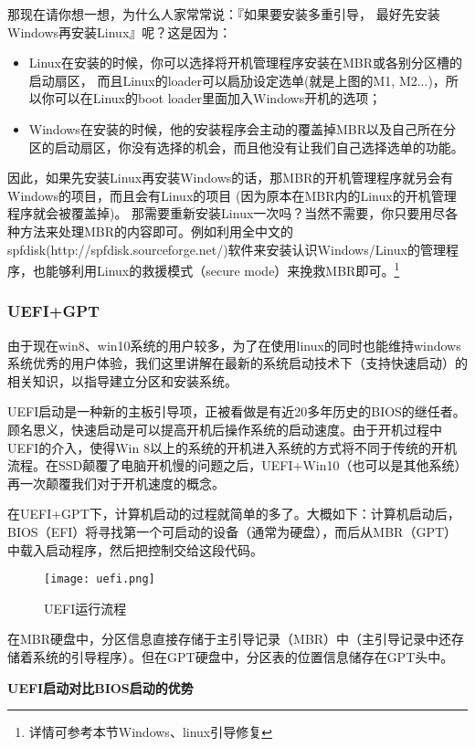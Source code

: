 那现在请你想一想，为什么人家常常说：『如果要安装多重引导， 最好先安装Windows再安装Linux』呢？这是因为：
\begin{itemize}
	\item Linux在安装的时候，你可以选择将开机管理程序安装在MBR或各别分区槽的启动扇区， 而且Linux的loader可以扃劢设定选单(就是上图的M1, M2...)，所以你可以在Linux的boot loader里面加入Windows开机的选项；
	\item Windows在安装的时候，他的安装程序会主动的覆盖掉MBR以及自己所在分区的启动扇区，你没有选择的机会，而且他没有让我们自己选择选单的功能。
\end{itemize}

因此，如果先安装Linux再安装Windows的话，那MBR的开机管理程序就叧会有Windows的项目，而且会有Linux的项目 (因为原本在MBR内的Linux的开机管理程序就会被覆盖掉)。 那需要重新安装Linux一次吗？当然不需要，你只要用尽各种方法来处理MBR的内容即可。例如利用全中文的spfdisk(http://spfdisk.sourceforge.net/)软件来安装认识Windows/Linux的管理程序，也能够利用Linux的救援模式（secure mode）来挽救MBR即可。\footnote{详情可参考本节Windows、linux引导修复}

\subsubsection{UEFI+GPT}
由于现在win8、win10系统的用户较多，为了在使用linux的同时也能维持windows系统优秀的用户体验，我们这里讲解在最新的系统启动技术下（支持快速启动）的相关知识，以指导建立分区和安装系统。

UEFI启动是一种新的主板引导项，正被看做是有近20多年历史的BIOS的继任者。顾名思义，快速启动是可以提高开机后操作系统的启动速度。由于开机过程中UEFI的介入，使得Win 8以上的系统的开机进入系统的方式将不同于传统的开机流程。在SSD颠覆了电脑开机慢的问题之后，UEFI+Win10（也可以是其他系统）再一次颠覆我们对于开机速度的概念。

在UEFI+GPT下，计算机启动的过程就简单的多了。大概如下：计算机启动后，BIOS（EFI）将寻找第一个可启动的设备（通常为硬盘），而后从MBR（GPT）中载入启动程序，然后把控制交给这段代码。

\begin{figure}[H]
	\centering\texttt{[image: uefi.png]}
	\caption{UEFI运行流程}
\end{figure}

在MBR硬盘中，分区信息直接存储于主引导记录（MBR）中（主引导记录中还存储着系统的引导程序）。但在GPT硬盘中，分区表的位置信息储存在GPT头中。

\textbf{UEFI启动对比BIOS启动的优势}

